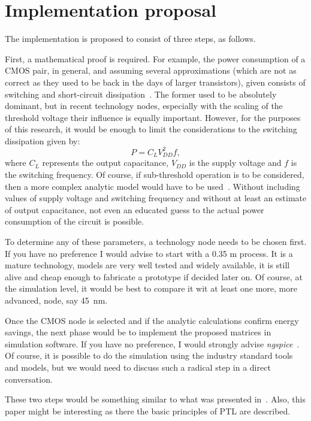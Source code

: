 \documentclass[12pt]{article}
\begin{document}
\section{Implementation proposal}
\label{proposal}

The implementation is proposed to consist of three steps, as follows.

First, a mathematical proof is required. For example, the power consumption of a CMOS pair, in general, and assuming several approximations (which are not as correct as they used to be back in the days of larger transistors), given consists of switching and short-circuit dissipation~\cite{Sedra:2010}. The former used to be absolutely dominant, but in recent technology nodes, especially with the scaling of the threshold voltage their influence is equally important. However, for the purposes of this research, it would be enough to limit the considerations to the switching dissipation given by:
\begin{equation}
P = C_L V_{DD}^2f,
\label{Equ:psw}
\end{equation}
where $C_L$ represents the output capacitance, $V_{DD}$ is the supply voltage and $f$ is the switching frequency. Of course, if sub-threshold operation is to be considered, then a more complex analytic model would have to be used~\cite{Dokic:2016}. Without including values of supply voltage and switching frequency and without at least an estimate of output capacitance, not even an educated guess to the actual power consumption of the circuit is possible.

To determine any of these parameters, a technology node needs to be chosen first. If you have no preference I would advise to start with a 0.35 \textmugreek m process. It is a mature technology, models are very well tested and widely available, it is still alive and cheap enough to fabricate a prototype if decided later on. Of course, at the simulation level, it would be best to compare it wit at least one more, more advanced, node, say \mbox{45 nm}.

Once the CMOS node is selected and if the analytic calculations confirm energy savings, the next phase would be to implement the proposed matrices in simulation software. If you have no preference, I would strongly advise \textit{ngspice}~\cite{ngspice:2017}. Of course, it is possible to do the simulation using the industry standard tools and models, but we would need to discuss such a radical step in a direct conversation.

These two steps would be something similar to what was presented in~\cite{Pajkanovic:2012}. Also, this paper might be interesting as there the basic principles of PTL are described.
\end{document}
